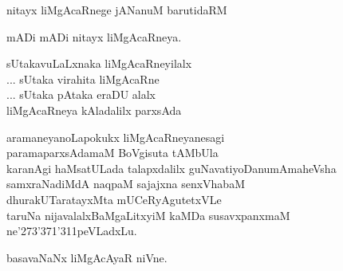 \begin{entry}
\gl{}
\gl{}
\begin{shl}
nitayx liMgAcaRnege jANanuM barutidaRM
\end{shl}
\gl{}
\begin{shl}
mADi mADi nitayx liMgAcaRneya.
\end{shl}
\gl{}
\begin{shl}
sUtakavuLaLxnaka liMgAcaRneyilalx\\
... sUtaka virahita liMgAcaRne\\
... sUtaka pAtaka eraDU alalx\\
liMgAcaRneya kAladalilx parxsAda
\end{shl}
\end{entry}

\begin{entry}
\gl{}
\begin{shl}
aramaneyanoLapokukx liMgAcaRneyanesagi\\
paramaparxsAdamaM BoVgisuta tAMbUla\\
karanAgi haMsatULada talapxdalilx guNavatiyoDanumAmaheVsha\\
samxraNadiMdA naqpaM sajajxna senxVhabaM\\
dhurakUTaratayxMta mUCeRyAgutetxVLe\\
taruNa nijavalalxBaMgaLitxyiM kaMDa susavxpanxmaM ne\char'273\char'371\char'311peVLadxLu.
\end{shl}
\end{entry}

\begin{entry}
\gl{}
\begin{shl}
basavaNaNx liMgAcAyaR niVne.
\end{shl}
\end{entry}

